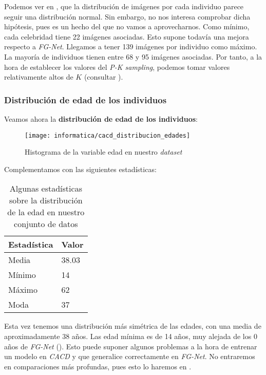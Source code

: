 Podemos ver en , que la distribución de imágenes por cada individuo parece seguir una distribución normal. Sin embargo, no nos interesa comprobar dicha hipótesis, pues es un hecho del que no vamos a aprovecharnos. Como mínimo, cada celebridad tiene 22 imágenes asociadas. Esto supone todavía una mejora respecto a \textit{FG-Net}. Llegamos a tener 139 imágenes por individuo como máximo. La mayoría de individuos tienen entre 68 y 95 imágenes asociadas. Por tanto, a la hora de establecer los valores del \textit{P-K sampling}, podemos tomar valores relativamente altos de $K$ (consultar ).

\subsubsection{Distribución de edad de los individuos}

Veamos ahora la \textbf{distribución de edad de los individuos}:

\begin{figure}[H]
    \centering
    \texttt{[image: informatica/cacd\_distribucion\_edades]}
    \caption{Histograma de la variable edad en nuestro \textit{dataset}}
\end{figure}

Complementamos con las siguientes estadísticas:

\begin{table}[H]
\centering
\begin{tabular}{|l|l|}
    \hline
    \textbf{Estadística} & \textbf{Valor} \\
    \hline

    Media  & 38.03 \\
    Mínimo & 14    \\
    Máximo & 62    \\
    Moda   & 37    \\

    \hline

\end{tabular}
\caption{Algunas estadísticas sobre la distribución de la edad en nuestro conjunto de datos}
\end{table}

Esta vez tenemos una distribución más simétrica de las edades, con una media de aproximadamente 38 años. Las edad mínima es de 14 años, muy alejada de los 0 años de \textit{FG-Net} (). Esto puede suponer algunos problemas a la hora de entrenar un modelo en \textit{CACD} y que generalice correctamente en \textit{FG-Net}. No entraremos en comparaciones más profundas, pues esto lo haremos en .

